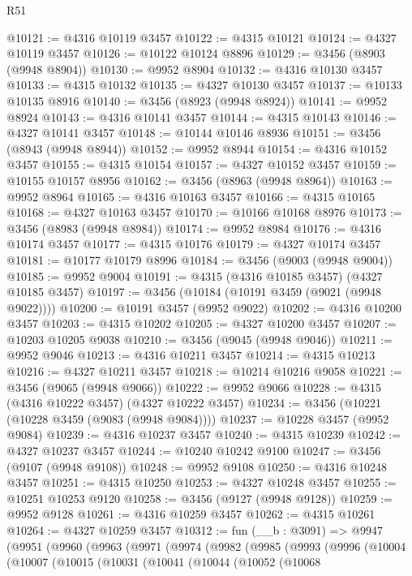 \begin{lexlean}{R51}
\begin{coremodule}
@10121 := @4316 @10119 @3457
@10122 := @4315 @10121
@10124 := @4327 @10119 @3457
@10126 := @10122 @10124 @8896
@10129 := @3456 (@8903 (@9948 @8904))
@10130 := @9952 @8904
@10132 := @4316 @10130 @3457
@10133 := @4315 @10132
@10135 := @4327 @10130 @3457
@10137 := @10133 @10135 @8916
@10140 := @3456 (@8923 (@9948 @8924))
@10141 := @9952 @8924
@10143 := @4316 @10141 @3457
@10144 := @4315 @10143
@10146 := @4327 @10141 @3457
@10148 := @10144 @10146 @8936
@10151 := @3456 (@8943 (@9948 @8944))
@10152 := @9952 @8944
@10154 := @4316 @10152 @3457
@10155 := @4315 @10154
@10157 := @4327 @10152 @3457
@10159 := @10155 @10157 @8956
@10162 := @3456 (@8963 (@9948 @8964))
@10163 := @9952 @8964
@10165 := @4316 @10163 @3457
@10166 := @4315 @10165
@10168 := @4327 @10163 @3457
@10170 := @10166 @10168 @8976
@10173 := @3456 (@8983 (@9948 @8984))
@10174 := @9952 @8984
@10176 := @4316 @10174 @3457
@10177 := @4315 @10176
@10179 := @4327 @10174 @3457
@10181 := @10177 @10179 @8996
@10184 := @3456 (@9003 (@9948 @9004))
@10185 := @9952 @9004
@10191 := @4315 (@4316 @10185 @3457) (@4327 @10185 @3457)
@10197 := @3456 (@10184 (@10191 @3459 (@9021 (@9948 @9022))))
@10200 := @10191 @3457 (@9952 @9022)
@10202 := @4316 @10200 @3457
@10203 := @4315 @10202
@10205 := @4327 @10200 @3457
@10207 := @10203 @10205 @9038
@10210 := @3456 (@9045 (@9948 @9046))
@10211 := @9952 @9046
@10213 := @4316 @10211 @3457
@10214 := @4315 @10213
@10216 := @4327 @10211 @3457
@10218 := @10214 @10216 @9058
@10221 := @3456 (@9065 (@9948 @9066))
@10222 := @9952 @9066
@10228 := @4315 (@4316 @10222 @3457) (@4327 @10222 @3457)
@10234 := @3456 (@10221 (@10228 @3459 (@9083 (@9948 @9084))))
@10237 := @10228 @3457 (@9952 @9084)
@10239 := @4316 @10237 @3457
@10240 := @4315 @10239
@10242 := @4327 @10237 @3457
@10244 := @10240 @10242 @9100
@10247 := @3456 (@9107 (@9948 @9108))
@10248 := @9952 @9108
@10250 := @4316 @10248 @3457
@10251 := @4315 @10250
@10253 := @4327 @10248 @3457
@10255 := @10251 @10253 @9120
@10258 := @3456 (@9127 (@9948 @9128))
@10259 := @9952 @9128
@10261 := @4316 @10259 @3457
@10262 := @4315 @10261
@10264 := @4327 @10259 @3457
@10312 := fun (__b : @3091) =>
  @9947
    (@9951
      (@9960
        (@9963
          (@9971
            (@9974
              (@9982
                (@9985
                  (@9993
                    (@9996
                      (@10004
                        (@10007
                          (@10015
                            (@10031
                              (@10041
                                (@10044
                                  (@10052
                                    (@10068

\end{coremodule}
\end{lexlean}

